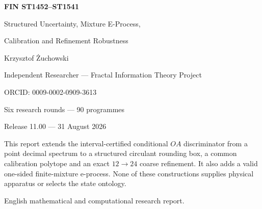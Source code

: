 \documentclass[11pt,a4paper]{article}
\begin{document}
\begin{titlepage}\centering\vspace*{14mm}
{\Huge\bfseries FIN ST1452--ST1541\par}\vspace{4mm}
{\LARGE Structured Uncertainty, Mixture E-Process,\par}\vspace{2mm}
{\LARGE Calibration and Refinement Robustness\par}\vspace{12mm}
{\Large Krzysztof \.Zuchowski\par}
{\normalsize Independent Researcher --- Fractal Information Theory Project\par}
{\normalsize ORCID: 0009-0002-0909-3613\par}\vspace{9mm}
{\large Six research rounds --- 90 programmes\par}
{\large Release 11.00 --- 31 August 2026\par}
\vfill
\begin{minipage}{.87\textwidth}\small
This report extends the interval-certified conditional $OA$ discriminator from
a point decimal spectrum to a structured circulant rounding box, a common
calibration polytope and an exact $12\to24$ coarse refinement.  It also adds a
valid one-sided finite-mixture e-process.  None of these constructions supplies
physical apparatus or selects the state ontology.
\end{minipage}\vfill
{\small English mathematical and computational research report.}
\end{titlepage}
\end{document}
